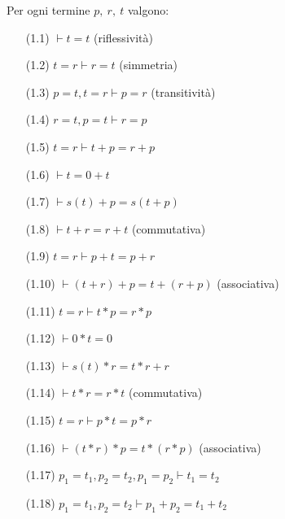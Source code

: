 \begin{prop}
Per ogni termine $p,\ r,\ t$ valgono:
\begin{enumerate}
	\item[(1.1)] $\vdash t=t$        (riflessivit\`a)
	\vspace{.2cm}
	\item[(1.2)] $t=r\vdash r=t$     (simmetria)
	\vspace{.2cm}
	\item[(1.3)] $p=t,t=r\vdash p=r$ (transitivit\`a)
	\vspace{.2cm}
	\item[(1.4)] $r=t,p=t\vdash r=p$
	\vspace{.2cm}
	\item[(1.5)] $t=r\vdash t+p=r+p$
	\vspace{.2cm}
	\item[(1.6)] $\vdash t=0+t$
	\vspace{.2cm}
	\item[(1.7)] $\vdash s(t)+p=s(t+p)$
	\vspace{.2cm}
	\item[(1.8)] $\vdash t+r=r+t$         (commutativa)
	\vspace{.2cm}
	\item[(1.9)] $t=r\vdash p+t=p+r$
	\vspace{.2cm}
	\item[(1.10)] $\vdash (t+r)+p=t+(r+p)$ (associativa)
	\vspace{.2cm}
	\item[(1.11)] $t=r\vdash t*p=r*p$
	\vspace{.2cm}
	\item[(1.12)] $\vdash 0*t=0$
	\vspace{.2cm}
	\item[(1.13)] $\vdash s(t)*r=t*r+r$
	\vspace{.2cm}
	\item[(1.14)] $\vdash t*r=r*t$         (commutativa)
	\vspace{.2cm}
	\item[(1.15)] $t=r\vdash p*t=p*r$
	\vspace{.2cm}
	\item[(1.16)] $\vdash (t*r)*p=t*(r*p)$ (associativa)
	\vspace{.2cm}
	\item[(1.17)] $p_1=t_1,p_2=t_2,p_1=p_2\vdash t_1=t_2$
	\vspace{.2cm}
	\item[(1.18)] $p_1=t_1,p_2=t_2\vdash p_1+p_2=t_1+t_2$
\end{enumerate}
\end{prop}
